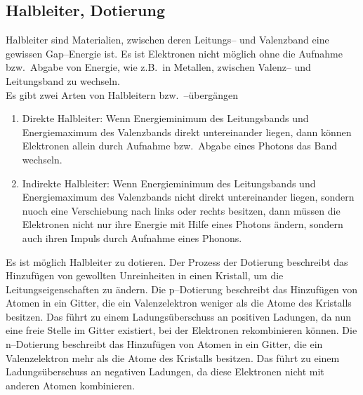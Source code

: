 \documentclass[a4paper,10pt]{article}
\numberwithin{equation}{section}
\begin{document}
\subsection{Halbleiter, Dotierung}
Halbleiter sind Materialien, zwischen deren Leitungs-- und Valenzband eine gewissen Gap--Energie ist.
Es ist Elektronen nicht möglich ohne die Aufnahme bzw.\ Abgabe von Energie, wie z.B.\ in Metallen, zwischen Valenz-- und Leitungsband zu wechseln.
\\Es gibt zwei Arten von Halbleitern bzw.\ --übergängen
\begin{enumerate}[label=--]
	\item Direkte Halbleiter: Wenn Energieminimum des Leitungsbands und Energiemaximum des Valenzbands direkt untereinander liegen, dann können Elektronen allein durch Aufnahme bzw.\ Abgabe eines Photons das Band wechseln.
	\item Indirekte Halbleiter: Wenn Energieminimum des Leitungsbands und Energiemaximum des Valenzbands nicht direkt untereinander liegen, sondern nuoch eine Verschiebung nach links oder rechts besitzen, dann müssen die Elektronen nicht nur ihre Energie mit Hilfe eines Photons ändern, sondern auch ihren Impuls durch Aufnahme eines Phonons.
\end{enumerate}
Es ist möglich Halbleiter zu dotieren.
Der Prozess der Dotierung beschreibt das Hinzufügen von gewollten Unreinheiten in einen Kristall, um die Leitungseigenschaften zu ändern.
Die p--Dotierung beschreibt das Hinzufügen von Atomen in ein Gitter, die ein Valenzelektron weniger als die Atome des Kristalls besitzen.
Das führt zu einem Ladungsüberschuss an \glqq positiven Ladungen\grqq{}, da nun eine freie Stelle im Gitter existiert, bei der Elektronen rekombinieren können.
Die n--Dotierung beschreibt das Hinzufügen von Atomen in ein Gitter, die ein Valenzelektron mehr als die Atome des Kristalls besitzen.
Das führt zu einem Ladungsüberschuss an negativen Ladungen, da diese Elektronen nicht mit anderen Atomen kombinieren.
\end{document}
